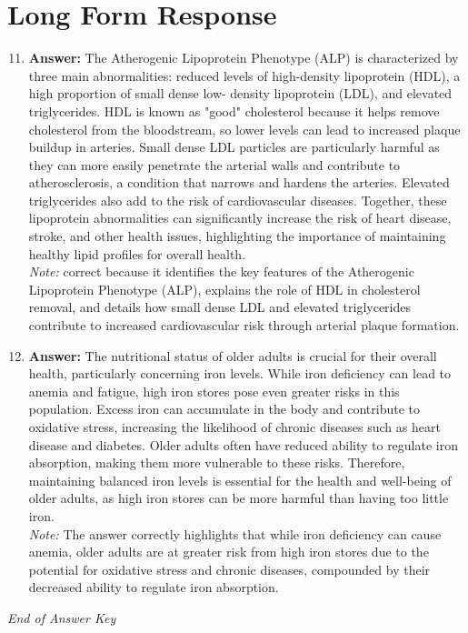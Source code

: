 \documentclass[12pt]{article}
\begin{document}
\section*{Long Form Response}
\begin{enumerate}[label=\arabic*.]
\setcounter{enumi}{10}
\item \textbf{Answer:} The Atherogenic Lipoprotein Phenotype (ALP) is characterized by three main abnormalities: reduced levels of high-density lipoprotein (HDL), a high proportion of small dense low- density lipoprotein (LDL), and elevated triglycerides. HDL is known as "good" cholesterol because it helps remove cholesterol from the bloodstream, so lower levels can lead to increased plaque buildup in arteries. Small dense LDL particles are particularly harmful as they can more easily penetrate the arterial walls and contribute to atherosclerosis, a condition that narrows and hardens the arteries. Elevated triglycerides also add to the risk of cardiovascular diseases. Together, these lipoprotein abnormalities can significantly increase the risk of heart disease, stroke, and other health issues, highlighting the importance of maintaining healthy lipid profiles for overall health.
\\ \textit{Note:} correct because it identifies the key features of the Atherogenic Lipoprotein Phenotype (ALP), explains the role of HDL in cholesterol removal, and details how small dense LDL and elevated triglycerides contribute to increased cardiovascular risk through arterial plaque formation.
\item \textbf{Answer:} The nutritional status of older adults is crucial for their overall health, particularly concerning iron levels. While iron deficiency can lead to anemia and fatigue, high iron stores pose even greater risks in this population. Excess iron can accumulate in the body and contribute to oxidative stress, increasing the likelihood of chronic diseases such as heart disease and diabetes. Older adults often have reduced ability to regulate iron absorption, making them more vulnerable to these risks. Therefore, maintaining balanced iron levels is essential for the health and well-being of older adults, as high iron stores can be more harmful than having too little iron.
\\ \textit{Note:} The answer correctly highlights that while iron deficiency can cause anemia, older adults are at greater risk from high iron stores due to the potential for oxidative stress and chronic diseases, compounded by their decreased ability to regulate iron absorption.
\end{enumerate}

\vfill
\noindent\textit{End of Answer Key}
\end{document}
